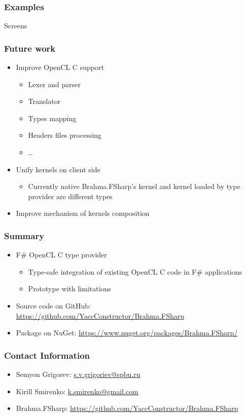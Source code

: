 \documentclass[xcolor=table]{beamer}
\begin{document}
            
\begin{frame}
  \transwipe[direction=90]
  \frametitle{Examples}         
  Screens
\end{frame}     

\begin{frame}
  \transwipe[direction=90]
  \frametitle{Future work}         
\begin{itemize}
\item Improve OpenCL C support
\begin{itemize}
\item Lexer and parser
\item Translator 
\item Types mapping
\item Headers files processing
\item \dots
\end{itemize}
\item Unify kernels on client side
\begin{itemize}
\item Currently native Brahma.FSharp's kernel and kernel loaded by type provider are different 
types
\end{itemize}
\item Improve mechanism of kernels composition
\end{itemize}
\end{frame}     
            
            
\begin{frame}
  \transwipe[direction=90]
  \frametitle{Summary}         
\begin{itemize}
\item F\# OpenCL C type provider
\begin {itemize}
\item Type-safe integration of existing OpenCL C code in F\# applications
\item Prototype with limitations
\end{itemize}
\vspace{1cm}
\item Source code on GitHub: \url{https://github.com/YaccConstructor/Brahma.FSharp}
\item Package on NuGet: \url{https://www.nuget.org/packages/Brahma.FSharp/}
\end{itemize}
\end{frame}           
            
\begin{frame}
\transwipe[direction=90]
\frametitle{Contact Information}
\begin{itemize}
  \item Semyon Grigorev: \href{mailto:s.v.grigoriev@spbu.ru}{s.v.grigoriev@spbu.ru}
  \item Kirill Smirenko: \href{mailto:k.smirenko@gmail.com}{k.smirenko@gmail.com}
\end{itemize}
\begin{itemize}
  \item Brahma.FSharp: \href{https://github.com/YaccConstructor/Brahma.FSharp}{https://github.com/YaccConstructor/Brahma.FSharp}
\end{itemize}
\hspace{2cm}
\end{frame}
\end{document}
